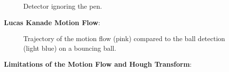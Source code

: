 \documentclass{sciposter}
\begin{document}
\begin{multicols}{3}
\begin{figure}[!h]
	\centering
			\setlength{\fboxsep}{1pt}
			\setlength{\fboxrule}{1pt}
	\caption{Detector ignoring the pen.}
	\label{fig:yes_hough}
\end{figure}

\textbf{Lucas Kanade Motion Flow}:

\begin{figure}[!h]
	\centering
			\setlength{\fboxsep}{1pt}
			\setlength{\fboxrule}{1pt}
	\caption{Trajectory of the motion flow (pink) compared to the ball detection (light blue) on a bouncing ball.}
	\label{fig:motion}
\end{figure}

\textbf{Limitations of the Motion Flow and Hough Transform}:


\end{multicols}
\end{document}
